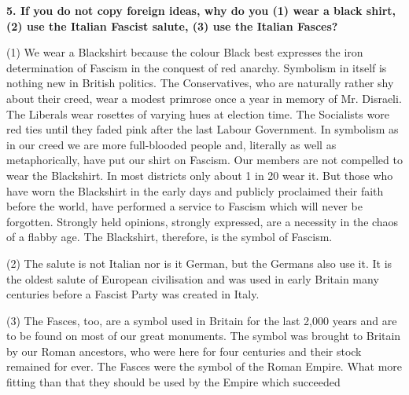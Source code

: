 \documentclass{book}
\begin{document}
\begin{flushright}
\textbf{5. If you do not copy foreign ideas, why do you (1) wear a black shirt, (2) use the Italian
    Fascist salute, (3) use the Italian Fasces?}

(1) We wear a Blackshirt because the colour Black best expresses the iron determination of
Fascism in the conquest of red anarchy. Symbolism in itself is nothing new in British politics.
The Conservatives, who are naturally rather shy about their creed, wear a modest primrose once
a year in memory of Mr. Disraeli. The Liberals wear rosettes of varying hues at election time.
The Socialists wore red ties until they faded pink after the last Labour Government. In
symbolism as in our creed we are more full-blooded people and, literally as well as
metaphorically, have put our shirt on Fascism. Our members are not compelled to wear the
Blackshirt. In most districts only about 1 in 20 wear it. But those who have worn the Blackshirt
in the early days and publicly proclaimed their faith before the world, have performed a service
to Fascism which will never be forgotten. Strongly held opinions, strongly expressed, are a
necessity in the chaos of a flabby age. The Blackshirt, therefore, is the symbol of Fascism.

(2) The salute is not Italian nor is it German, but the Germans also use it. It is the oldest salute of
European civilisation and was used in early Britain many centuries before a Fascist Party was
created in Italy.

(3) The Fasces, too, are a symbol used in Britain for the last 2,000 years and are to be found on
most of our great monuments. The symbol was brought to Britain by our Roman ancestors, who
were here for four centuries and their stock remained for ever. The Fasces were the symbol of the
Roman Empire. What more fitting than that they should be used by the Empire which succeeded
\end{flushright}
\end{document}

